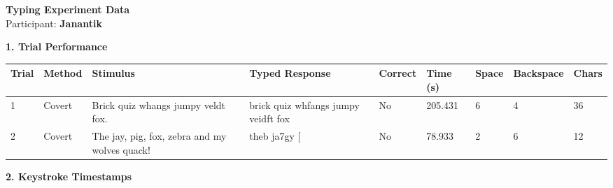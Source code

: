 \documentclass[10pt,a4paper]{article}
\begin{document}

\begin{center}
    {\Large\bfseries Typing Experiment Data}\\
    \vspace{2pt}
    Participant: \textbf{Janantik}
\end{center}

\vspace{0.25cm}


\noindent
{\large\bfseries 1. Trial Performance}

\vspace{0.08cm}

\begin{center}
\begin{tabularx}{\textwidth}{
    C{0.45in}
    C{0.65in}
    L{2.35in}
    L{2.55in}
    C{0.65in}
    C{0.65in}
    C{0.55in}
    C{0.75in}
    C{0.55in}
}
\toprule

\textbf{Trial} &
\textbf{Method} &
\textbf{Stimulus} &
\textbf{Typed Response} &
\textbf{Correct} &
\textbf{Time (s)} &
\textbf{Space} &
\textbf{Backspace} &
\textbf{Chars}
\\

\midrule

1 &
Covert &
Brick quiz whangs jumpy veldt fox. &
brick quiz whfangs jumpy  veidft fox &
No &
205.431 &
6 &
4 &
36
\\

2 &
Covert &
The jay, pig, fox, zebra and my wolves quack! &
theb ja7gy [ &
No &
78.933 &
2 &
6 &
12
\\

\bottomrule
\end{tabularx}
\end{center}

\vspace{0.35cm}


\noindent
{\large\bfseries 2. Keystroke Timestamps}

\vspace{0.08cm}
\end{document}
